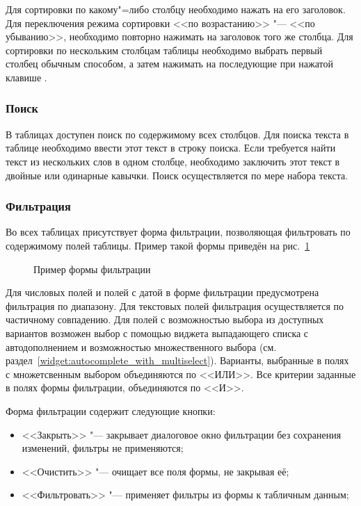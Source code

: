 Для сортировки по какому"=либо столбцу необходимо нажать на его заголовок. Для переключения режима сортировки <<по возрастанию>> "--- <<по убыванию>>,
необходимо повторно нажимать на заголовок того же столбца. Для сортировки по нескольким столбцам таблицы необходимо выбрать первый столбец обычным способом,
а затем нажимать на последующие при нажатой клавише .

\subsubsection{Поиск}

В таблицах доступен поиск по содержимому всех столбцов. Для поиска текста в таблице необходимо ввести этот текст в строку поиска. Если требуется 
найти текст из нескольких слов в одном столбце, необходимо заключить этот текст в двойные или одинарные кавычки. Поиск осуществляется по мере набора текста.

\subsubsection{Фильтрация}

Во всех таблицах присутствует форма фильтрации, позволяющая фильтровать по содержимому полей таблицы. Пример такой формы приведён на рис.~\ref{img:datatables:filter_form}

\begin{figure}[H]
	\caption{Пример формы фильтрации}
	\label{img:datatables:filter_form}
\end{figure}

Для числовых полей и полей с датой в форме фильтрации предусмотрена фильтрация по диапазону. Для текстовых полей
фильтрация осуществляется по частичному совпадению. Для полей с возможностью выбора из доступных вариантов возможен выбор с помощью виджета выпадающего списка с автодополнением и возможностью множественного выбора (см. раздел~\ref{widget:autocomplete_with_multiselect}). Варианты, выбранные в полях с множетсвенным выбором объединяются по <<ИЛИ>>.
Все критерии заданные в полях формы фильтрации, объединяются по <<И>>.

Форма фильтрации содержит следующие кнопки:
\begin{itemize}
	\item <<Закрыть>> "--- закрывает диалоговое окно фильтрации без сохранения изменений, фильтры не применяются;
	\item <<Очистить>> "--- очищает все поля формы, не закрывая её;
	\item <<Фильтровать>> "--- применяет фильтры из формы к табличным данным;
\end{itemize}

